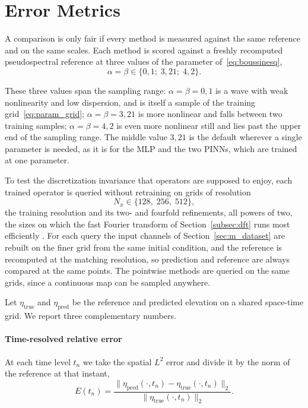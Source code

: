 \section{Error Metrics}
\label{sec:m_metrics}

A comparison is only fair if every method is measured against the same reference and on the same scales. Each method is scored against a freshly recomputed pseudospectral reference at three values of the parameter of~\eqref{eq:boussinesq},
\begin{equation}\label{eq:m_eval_params}
    \alpha = \beta \in \{0{,}1;\; 3{,}21;\; 4{,}2\}.
\end{equation}

These three values span the sampling range: $\alpha=\beta=0{,}1$ is a wave with weak nonlinearity and low dispersion, and is itself a sample of the training grid~\eqref{eq:param_grid}; $\alpha=\beta=3{,}21$ is more nonlinear and falls between two training samples; $\alpha=\beta=4{,}2$ is even more nonlinear still and lies past the upper end of the sampling range. The middle value $3{,}21$ is the default wherever a single parameter is needed, as it is for the MLP and the two PINNs, which are trained at one parameter.

To test the discretization invariance that operators are supposed to enjoy, each trained operator is queried without retraining on grids of resolution
\begin{equation}\label{eq:m_eval_res}
    N_x \in \{128,\; 256,\; 512\},
\end{equation}
the training resolution and its two- and fourfold refinements, all powers of two, the sizes on which the fast Fourier transform of Section~\ref{subsec:dft} runs most efficiently \parencite{trefethen2000}. For each query the input channels of Section~\ref{sec:m_dataset} are rebuilt on the finer grid from the same initial condition, and the reference is recomputed at the matching resolution, so prediction and reference are always compared at the same points. The pointwise methods are queried on the same grids, since a continuous map can be sampled anywhere.

Let $\eta_{\text{true}}$ and $\eta_{\text{pred}}$ be the reference and predicted elevation on a shared space-time grid. We report three complementary numbers.

\paragraph{Time-resolved relative error} At each time level $t_n$ we take the spatial $L^2$ error and divide it by the norm of the reference at that instant,
\begin{equation}\label{eq:m_rel_time}
    E(t_n) = \frac{\bigl\| \eta_{\text{pred}}(\cdot, t_n) - \eta_{\text{true}}(\cdot, t_n) \bigr\|_2}{\bigl\| \eta_{\text{true}}(\cdot, t_n) \bigr\|_2}.
\end{equation}

